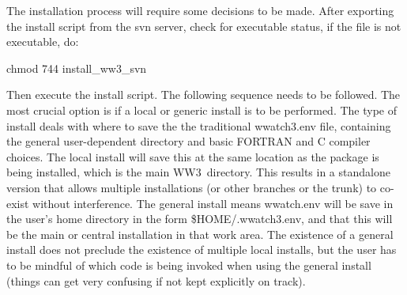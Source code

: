 \documentclass[12pt]{article}
\newcommand{\ws}{WW3}
\newcommand{\file}{\sf}
\begin{document}
The installation process will require some decisions to be made. After exporting
the install script from the svn server, check for executable status, if the file
is not executable, do:

\vspace{\baselineskip}
\centerline{\file chmod 744 install\_ww3\_svn}
\vspace{\baselineskip}

Then execute the install script. The following sequence needs to be followed.
The most crucial option is if a local or generic install is to be performed.
The type of install deals with where to save the the traditional {\file wwatch3.env} 
file, containing the general user-dependent directory and basic FORTRAN and C compiler 
choices. The local install will save this at the same location as the package
is being installed, which is the main \ws\ directory. This results in a standalone version
that allows multiple installations (or other branches or the trunk) to co-exist
without interference. The general install means wwatch.env will be save in the user's
home directory in the form {\file \$HOME/.wwatch3.env}, and that this will be the
main or central installation in that work area. The existence of a general install
does not preclude the existence of multiple local installs, but the user has to be 
mindful of which code is being invoked when using the general install (things can
get very confusing if not kept explicitly on track).
\end{document}
